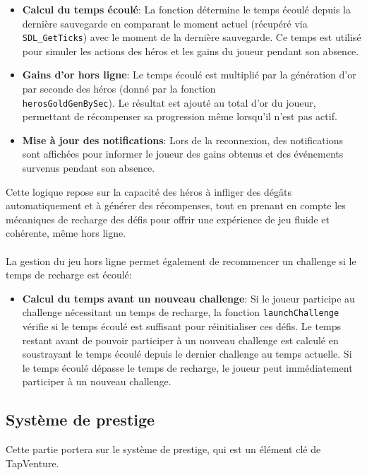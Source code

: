\documentclass[11pt,a4paper]{article}
\begin{document}
\begin{itemize}
    \item \textbf{Calcul du temps écoulé}: La fonction détermine le temps écoulé depuis la dernière sauvegarde en comparant le moment actuel (récupéré via \texttt{SDL\_GetTicks}) avec le moment de la dernière sauvegarde. Ce temps est utilisé pour simuler les actions des héros et les gains du joueur pendant son absence.
    
    \item \textbf{Gains d'or hors ligne}: Le temps écoulé est multiplié par la génération d’or par seconde des héros (donné par la fonction \\ \texttt{herosGoldGenBySec}). Le résultat est ajouté au total d’or du joueur, permettant de récompenser sa progression même lorsqu’il n’est pas actif.
    
    \item \textbf{Mise à jour des notifications}: Lors de la reconnexion, des notifications sont affichées pour informer le joueur des gains obtenus et des événements survenus pendant son absence.
\end{itemize}

Cette logique repose sur la capacité des héros à infliger des dégâts automatiquement et à générer des récompenses, tout en prenant en compte les mécaniques de recharge des défis pour offrir une expérience de jeu fluide et cohérente, même hors ligne.\\\\
La gestion du jeu hors ligne permet également de recommencer un challenge si le temps de recharge est écoulé: 
\begin{itemize}
	\item \textbf{Calcul du temps avant un nouveau challenge}: Si le joueur participe au challenge nécessitant un temps de recharge, la fonction \texttt{launchChallenge} vérifie si le temps écoulé est suffisant pour réinitialiser ces défis. Le temps restant avant de pouvoir participer à un nouveau challenge est calculé en soustrayant le temps écoulé depuis le dernier challenge au temps actuelle. Si le temps écoulé dépasse le temps de recharge, le joueur peut immédiatement participer à un nouveau challenge.
\end{itemize}

\subsection{Système de prestige}
Cette partie portera sur le système de prestige, qui est un élément clé de TapVenture. 
\end{document}
